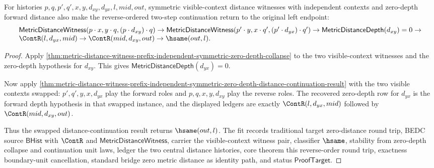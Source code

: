 \begin{theorem}
\label{thm:metric-distance-witness-prefix-independent-symmetric-zero-depth-reverse-distance-continuation-result}
For histories $p,q,p',q',x,y,d_{xy},d_{yx},l,mid,out$, symmetric
visible-context distance witnesses with independent contexts and zero-depth
forward distance also make the reverse-ordered two-step continuation return to
the original left endpoint:
$$
\begin{array}{l}
\mathsf{MetricDistanceWitness}(p\cdot x,y\cdot q,(p\cdot d_{xy})\cdot q)
\to
\mathsf{MetricDistanceWitness}(p'\cdot y,x\cdot q',(p'\cdot d_{yx})\cdot q')
\to
\mathsf{MetricDistanceDepth}(d_{xy})=0
\to
\\
\ContR(l,d_{yx},mid)\to
\ContR(mid,d_{xy},out)\to
\hsame(out,l).
\end{array}
$$
\end{theorem}
\begin{proof}
Apply
\autoref{thm:metric-distance-witness-prefix-independent-symmetric-zero-depth-collapse}
to the two visible-context witnesses and the zero-depth hypothesis for
$d_{xy}$. This gives $\mathsf{MetricDistanceDepth}(d_{yx})=0$.

Now apply
\autoref{thm:metric-distance-witness-prefix-independent-symmetric-zero-depth-distance-continuation-result}
with the two visible contexts swapped: $p',q',y,x,d_{yx}$ play the forward
roles and $p,q,x,y,d_{xy}$ play the reverse roles. The recovered zero-depth
row for $d_{yx}$ is the forward depth hypothesis in that swapped instance, and
the displayed ledgers are exactly $\ContR(l,d_{yx},mid)$ followed by
$\ContR(mid,d_{xy},out)$.

Thus the swapped distance-continuation result returns $\hsame(out,l)$. The
fit records traditional target zero-distance round trip, BEDC source
$\mathsf{BHist}$ with $\ContR$ and $\mathsf{MetricDistanceWitness}$, carrier
the visible-context witness pair, classifier $\hsame$, stability from
zero-depth collapse and continuation unit laws, ledger the two central distance
histories, core theorem this reverse-order round trip, exactness
boundary-unit cancellation, standard bridge zero metric distance as identity
path, and status $\mathsf{ProofTarget}$.
\end{proof}
